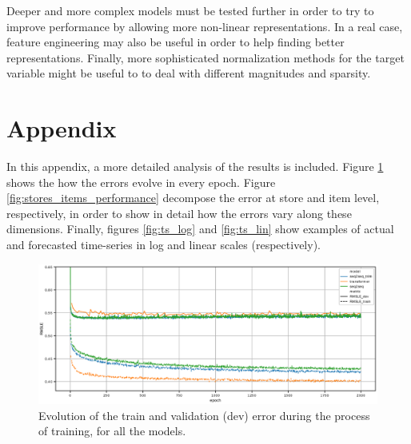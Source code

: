 \documentclass{elsarticle}
\begin{document}
	Deeper and more complex models must be tested further in order to try to improve performance by allowing more non-linear representations. In a real case, feature engineering may also be useful in order to help finding better representations. Finally, more sophisticated normalization methods for the target variable might be useful to to deal with different magnitudes and sparsity.
	
	\newpage
	
	
	
	
	\newpage
	\section*{Appendix}
	In this appendix, a more detailed analysis of the results is included. Figure \ref{fig:performance_evolution} shows the how the errors evolve in every epoch. Figure \ref{fig:stores_items_performance} decompose the error at store and item level, respectively, in order to show in detail how the errors vary along these dimensions. Finally, figures \ref{fig:ts_log} and \ref{fig:ts_lin} show examples of actual and forecasted time-series in log and linear scales (respectively).
	
	\begin{figure}[h!]
		\centering
		\includegraphics[width=1\linewidth]{img/evolution}
		\caption{Evolution of the train and validation (dev) error during the process of training, for all the models.}
		\label{fig:performance_evolution}
	\end{figure}
	
\end{document}
